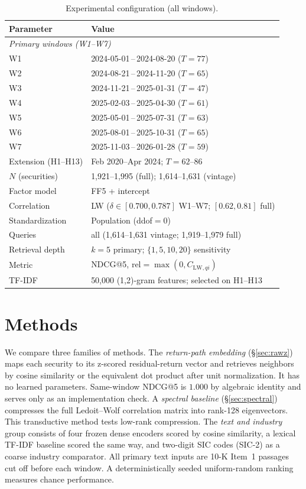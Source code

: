 \documentclass[sigconf,anonymous]{acmart}
\begin{document}
\begin{table}[t]
\caption{Experimental configuration (all windows).}
\label{tab:config}
\small
\footnotesize
\setlength{\tabcolsep}{3pt}
\begin{tabular}{lp{}}
\toprule
\textbf{Parameter} & \textbf{Value} \\
\midrule
\multicolumn{2}{l}{\emph{Primary windows (W1--W7)}} \\
W1 & 2024-05-01\,--\,2024-08-20 ($T{=}77$) \\
W2 & 2024-08-21\,--\,2024-11-20 ($T{=}65$) \\
W3 & 2024-11-21\,--\,2025-01-31 ($T{=}47$) \\
W4 & 2025-02-03\,--\,2025-04-30 ($T{=}61$) \\
W5 & 2025-05-01\,--\,2025-07-31 ($T{=}63$) \\
W6 & 2025-08-01\,--\,2025-10-31 ($T{=}65$) \\
W7 & 2025-11-03\,--\,2026-01-28 ($T{=}59$) \\
\midrule
Extension (H1--H13) & Feb 2020--Apr 2024; $T{=}62$--$86$ \\
$N$ (securities) & 1,921--1,995 (full); 1,614--1,631 (vintage) \\
Factor model & FF5 + intercept \\
Correlation & LW ($\delta{\in}[0.700,0.787]$ W1--W7; $[0.62,0.81]$ full) \\
Standardization & Population (ddof$=0$) \\
Queries & all (1,614--1,631 vintage; 1,919--1,979 full) \\
Retrieval depth & $k=5$ primary; $\{1,5,10,20\}$ sensitivity \\
Metric & NDCG@5, $\mathrm{rel} = \max(0,C_{\mathrm{LW},qi})$ \\
TF-IDF & 50,000 (1,2)-gram features; selected on H1--H13 \\
\bottomrule
\end{tabular}
\end{table}

\section{Methods}
\label{sec:method}

We compare three families of methods.
The \emph{return-path embedding} (\S\ref{sec:rawz}) maps each security to
its z-scored residual-return vector and retrieves neighbors by cosine similarity
or the equivalent dot product after unit normalization.  It has no learned
parameters.  Same-window NDCG@5 is $1.000$ by algebraic identity and serves only
as an implementation check.
A \emph{spectral baseline} (\S\ref{sec:spectral}) compresses the full
Ledoit--Wolf correlation matrix into rank-128 eigenvectors.  This transductive
method tests low-rank compression.  The \emph{text and industry} group consists
of four frozen dense encoders scored by cosine similarity, a lexical TF-IDF
baseline scored the same way, and two-digit SIC codes (SIC-2) as a coarse
industry comparator.  All
primary text inputs are 10-K Item~1 passages cut off before each window.  A
deterministically seeded uniform-random ranking measures chance performance.
\end{document}
